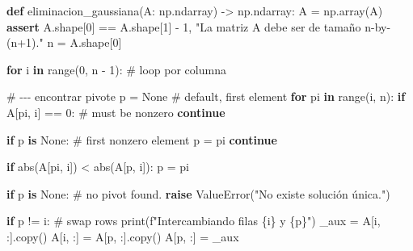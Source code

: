 \documentclass[
  letterpaper,
  DIV=11,
  numbers=noendperiod]{scrartcl}
\newenvironment{Shaded}{\begin{snugshade}}{\end{snugshade}}
\newcommand{\BuiltInTok}[1]{\textcolor[rgb]{0.00,0.23,0.31}{#1}}
\newcommand{\CommentTok}[1]{\textcolor[rgb]{0.37,0.37,0.37}{#1}}
\newcommand{\ControlFlowTok}[1]{\textcolor[rgb]{0.00,0.23,0.31}{\textbf{#1}}}
\newcommand{\DecValTok}[1]{\textcolor[rgb]{0.68,0.00,0.00}{#1}}
\newcommand{\KeywordTok}[1]{\textcolor[rgb]{0.00,0.23,0.31}{\textbf{#1}}}
\newcommand{\NormalTok}[1]{\textcolor[rgb]{0.00,0.23,0.31}{#1}}
\newcommand{\OperatorTok}[1]{\textcolor[rgb]{0.37,0.37,0.37}{#1}}
\newcommand{\PreprocessorTok}[1]{\textcolor[rgb]{0.68,0.00,0.00}{#1}}
\newcommand{\SpecialCharTok}[1]{\textcolor[rgb]{0.37,0.37,0.37}{#1}}
\newcommand{\SpecialStringTok}[1]{\textcolor[rgb]{0.13,0.47,0.30}{#1}}
\newcommand{\StringTok}[1]{\textcolor[rgb]{0.13,0.47,0.30}{#1}}
\newcommand{\VariableTok}[1]{\textcolor[rgb]{0.07,0.07,0.07}{#1}}
\begin{document}
\begin{Shaded}
\begin{Highlighting}[]
\KeywordTok{def}\NormalTok{ eliminacion\_gaussiana(A: np.ndarray) }\OperatorTok{{-}\textgreater{}}\NormalTok{ np.ndarray:}
\NormalTok{    A }\OperatorTok{=}\NormalTok{ np.array(A)}
    \ControlFlowTok{assert}\NormalTok{ A.shape[}\DecValTok{0}\NormalTok{] }\OperatorTok{==}\NormalTok{ A.shape[}\DecValTok{1}\NormalTok{] }\OperatorTok{{-}} \DecValTok{1}\NormalTok{, }\StringTok{"La matriz A debe ser de tamaño n{-}by{-}(n+1)."}
\NormalTok{    n }\OperatorTok{=}\NormalTok{ A.shape[}\DecValTok{0}\NormalTok{]}

    \ControlFlowTok{for}\NormalTok{ i }\KeywordTok{in} \BuiltInTok{range}\NormalTok{(}\DecValTok{0}\NormalTok{, n }\OperatorTok{{-}} \DecValTok{1}\NormalTok{):  }\CommentTok{\# loop por columna}

        \CommentTok{\# {-}{-}{-} encontrar pivote}
\NormalTok{        p }\OperatorTok{=} \VariableTok{None}  \CommentTok{\# default, first element}
        \ControlFlowTok{for}\NormalTok{ pi }\KeywordTok{in} \BuiltInTok{range}\NormalTok{(i, n):}
            \ControlFlowTok{if}\NormalTok{ A[pi, i] }\OperatorTok{==} \DecValTok{0}\NormalTok{:}
                \CommentTok{\# must be nonzero}
                \ControlFlowTok{continue}

            \ControlFlowTok{if}\NormalTok{ p }\KeywordTok{is} \VariableTok{None}\NormalTok{:}
                \CommentTok{\# first nonzero element}
\NormalTok{                p }\OperatorTok{=}\NormalTok{ pi}
                \ControlFlowTok{continue}

            \ControlFlowTok{if} \BuiltInTok{abs}\NormalTok{(A[pi, i]) }\OperatorTok{\textless{}} \BuiltInTok{abs}\NormalTok{(A[p, i]):}
\NormalTok{                p }\OperatorTok{=}\NormalTok{ pi}

        \ControlFlowTok{if}\NormalTok{ p }\KeywordTok{is} \VariableTok{None}\NormalTok{:}
            \CommentTok{\# no pivot found.}
            \ControlFlowTok{raise} \PreprocessorTok{ValueError}\NormalTok{(}\StringTok{"No existe solución única."}\NormalTok{)}

        \ControlFlowTok{if}\NormalTok{ p }\OperatorTok{!=}\NormalTok{ i:}
            \CommentTok{\# swap rows}
            \BuiltInTok{print}\NormalTok{(}\SpecialStringTok{f"Intercambiando filas }\SpecialCharTok{\{}\NormalTok{i}\SpecialCharTok{\}}\SpecialStringTok{ y }\SpecialCharTok{\{}\NormalTok{p}\SpecialCharTok{\}}\SpecialStringTok{"}\NormalTok{)}
\NormalTok{            \_aux }\OperatorTok{=}\NormalTok{ A[i, :].copy()}
\NormalTok{            A[i, :] }\OperatorTok{=}\NormalTok{ A[p, :].copy()}
\NormalTok{            A[p, :] }\OperatorTok{=}\NormalTok{ \_aux}


\end{Highlighting}
\end{Shaded}
\end{document}
